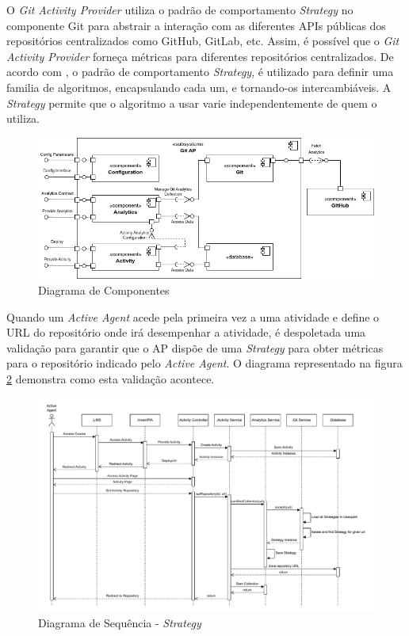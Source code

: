 \documentclass[12pt,a4paper,final]{article}
\begin{document}
    \noindent O \textit{Git Activity Provider} utiliza o padrão de comportamento \textit{Strategy} no componente Git para abstrair a interação com as diferentes APIs públicas dos repositórios centralizados como GitHub, GitLab, etc.
    Assim, é possível que o \textit{Git Activity Provider} forneça métricas para diferentes repositórios centralizados.
    De acordo com \cite{gamma_1994_design}, o padrão de comportamento \textit{Strategy}, é utilizado para definir uma familia de algoritmos, encapsulando cada um, e tornando-os intercambiáveis.
    A \textit{Strategy} permite que o algoritmo a usar varie independentemente de quem o utiliza.

    \begin{figure}[H]
        \centering
        \includegraphics[width=\textwidth]{diagrama_componentes_v2-AP.drawio}
        \caption{Diagrama de Componentes}
        \label{fig:diagrama-componentes}
    \end{figure}

    \noindent Quando um \textit{Active Agent} acede pela primeira vez a uma atividade e define o URL do repositório onde irá desempenhar a atividade, é despoletada uma validação para garantir que o AP dispõe de uma \textit{Strategy} para obter métricas para o repositório indicado pelo \textit{Active Agent}.
    O diagrama representado na figura \ref{fig:diagrama-sequencia} demonstra como esta validação acontece.

    \begin{figure}[H]
        \centering
        \includegraphics[width=\textwidth]{diagramas_sequencia.drawio}
        \caption{Diagrama de Sequência - \textit{Strategy}}
        \label{fig:diagrama-sequencia}
    \end{figure}
    \newpage
    \printbibliography
\end{document}
